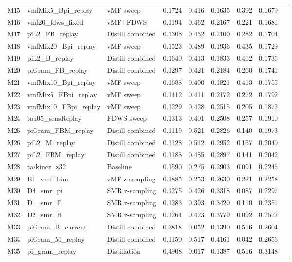 \documentclass[11pt,a4paper]{article}
\begin{document}
\begin{small}
\begin{longtable}{llp{3cm}rrrrrr}
    M15 & vmfMix5\_Bpi\_replay & vMF sweep & 0.1724 & 0.416 & 0.1635 & 0.392 & 0.1679 \\
    M16 & vmf20\_fdws\_fixed & vMF+FDWS & 0.1194 & 0.462 & 0.2167 & 0.221 & 0.1681 \\
    M17 & piL2\_FB\_replay & Distill combined & 0.1308 & 0.432 & 0.2100 & 0.282 & 0.1704 \\
    M18 & vmfMix20\_Bpi\_replay & vMF sweep & 0.1523 & 0.489 & 0.1936 & 0.435 & 0.1729 \\
    M19 & piL2\_B\_replay & Distill combined & 0.1640 & 0.413 & 0.1833 & 0.412 & 0.1736 \\
    M20 & piGram\_FB\_replay & Distill combined & 0.1297 & 0.421 & 0.2184 & 0.260 & 0.1741 \\
    M21 & vmfMix10\_Bpi\_replay & vMF sweep & 0.1688 & 0.400 & 0.1821 & 0.413 & 0.1755 \\
    M22 & vmfMix5\_FBpi\_replay & vMF sweep & 0.1412 & 0.411 & 0.2172 & 0.272 & 0.1792 \\
    M23 & vmfMix10\_FBpi\_replay & vMF sweep & 0.1229 & 0.428 & 0.2515 & 0.205 & 0.1872 \\
    M24 & tau05\_sensReplay & FDWS sweep & 0.1313 & 0.401 & 0.2508 & 0.257 & 0.1910 \\
    M25 & piGram\_FBM\_replay & Distill combined & 0.1119 & 0.521 & 0.2826 & 0.140 & 0.1973 \\
    M26 & piL2\_M\_replay & Distill combined & 0.1128 & 0.512 & 0.2952 & 0.157 & 0.2040 \\
    M27 & piL2\_FBM\_replay & Distill combined & 0.1188 & 0.485 & 0.2897 & 0.141 & 0.2042 \\
    M28 & taskincr\_z32 & Baseline & 0.1590 & 0.275 & 0.2903 & 0.091 & 0.2246 \\
    M29 & B1\_vmf\_bind & vMF z-sampling & 0.1885 & 0.253 & 0.2630 & 0.221 & 0.2258 \\
    M30 & D4\_smr\_pi & SMR z-sampling & 0.1275 & 0.426 & 0.3318 & 0.087 & 0.2297 \\
    M31 & D1\_smr\_F & SMR z-sampling & 0.1283 & 0.393 & 0.3420 & 0.110 & 0.2351 \\
    M32 & D2\_smr\_B & SMR z-sampling & 0.1264 & 0.423 & 0.3779 & 0.092 & 0.2522 \\
    M33 & piGram\_B\_current & Distill combined & 0.3818 & 0.052 & 0.1390 & 0.516 & 0.2604 \\
    M34 & piGram\_M\_replay & Distill combined & 0.1150 & 0.517 & 0.4161 & 0.042 & 0.2656 \\
    M35 & pi\_gram\_replay & Distillation & 0.4908 & 0.017 & 0.1387 & 0.516 & 0.3148 \\

\end{longtable}
\end{small}
\end{document}
